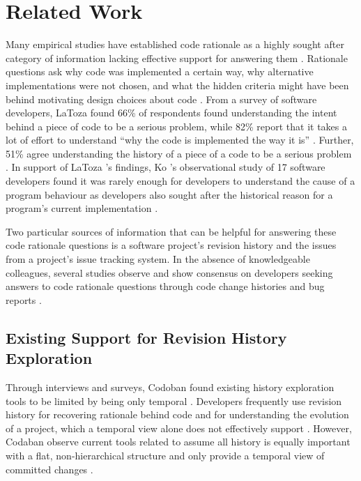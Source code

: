 \chapter{Related Work}
\label{ch:Related-Work}

Many empirical studies have established code rationale as a highly sought after category of information lacking effective support for answering them \cite{latoza_maintaining_2006, latoza_hard-answer_2010, ko_information_2007}. 
Rationale questions ask why code was implemented a certain way, why alternative implementations were not chosen, and what the hidden criteria might have been behind motivating design choices about code \cite{latoza_hard-answer_2010}.
From a survey of software developers, LaToza \etal found 66\% of respondents found understanding the intent behind a piece of code to be a serious problem, 
while 82\% report that it takes a lot of effort to understand ``why the code is implemented the way it is'' \cite{latoza_maintaining_2006}.
Further, 51\% agree understanding the history of a piece of a code to be a serious problem \cite{latoza_maintaining_2006}.
In support of LaToza \etal's findings, Ko \etal's observational study of 17 software developers found it was rarely enough for developers to understand the cause of a program behaviour as developers also  sought after the historical reason for a program's current implementation \cite{ko_information_2007}.

Two particular sources of information that can be helpful for answering these code rationale questions is a software project's revision history and the issues from a project's issue tracking system. 
In the absence of knowledgeable colleagues, several studies observe and show consensus on developers seeking answers to code rationale questions through code change histories and bug reports \cite{ko_information_2007, codoban_software_2015, robillard_turnover-induced_2021}.

\section{Existing Support for Revision History Exploration}

Through interviews and surveys, Codoban \etal found existing history exploration tools to be limited by being only temporal \cite{codoban_software_2015}.
Developers frequently use revision history for recovering rationale behind code and for understanding the evolution of a project, which a temporal view alone does not effectively support \cite{codoban_software_2015}.
However, Codaban \etal observe current tools related to  assume all history is equally important with a flat, non-hierarchical structure and only provide a temporal view of committed changes \cite{codoban_software_2015}.

